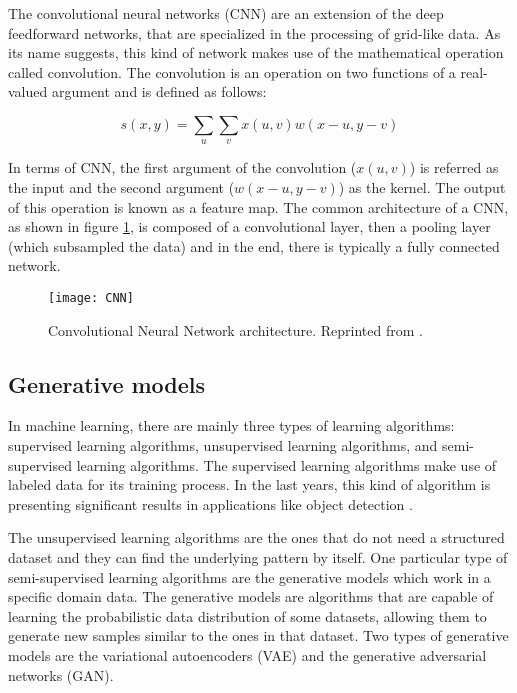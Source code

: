 The convolutional neural networks (CNN) \cite{Lecun1999} are an extension of the deep feedforward networks, that are specialized in the processing of grid-like data. As its name suggests, this kind of network makes use of the mathematical operation called convolution. The convolution is an operation on two functions of a real-valued argument and is defined as follows:

\begin{equation}
 s(x,y)=\sum_{u} \sum_{v} x(u,v) w(x-u,y-v)
\end{equation}

In terms of CNN, the first argument of the convolution (\begin{math} x(u,v) \end{math}) is referred as the input and the second argument (\begin{math} w(x-u,y-v) \end{math}) as the kernel. The output of this operation is known as a feature map. The common architecture of a CNN, as shown in figure \ref{fig:cnn}, is composed of a convolutional layer, then a pooling layer (which subsampled the data) and in the end, there is typically a fully connected network.

\begin{figure}[htb]
  \centering
  \texttt{[image: CNN]}
  \caption[Convolutional Neural Network architecture]{Convolutional Neural Network architecture. Reprinted from \cite{venkatesan_li_2017}.}
  \label{fig:cnn}
\end{figure}

\subsection{Generative models}

In machine learning, there are mainly three types of learning algorithms: supervised learning algorithms, unsupervised learning algorithms, and semi-supervised learning algorithms. The supervised learning algorithms make use of labeled data for its training process. In the last years, this kind of algorithm is presenting significant results in applications like object detection \cite{Liu2019}.

The unsupervised learning algorithms are the ones that do not need a structured dataset and they can find the underlying pattern by itself. One particular type of semi-supervised learning algorithms are the generative models which work in a specific domain data. The generative models are algorithms that are capable of learning the probabilistic data distribution of some datasets, allowing them to generate new samples similar to the ones in that dataset. Two types of generative models are the variational autoencoders (VAE) and the generative adversarial networks (GAN).


